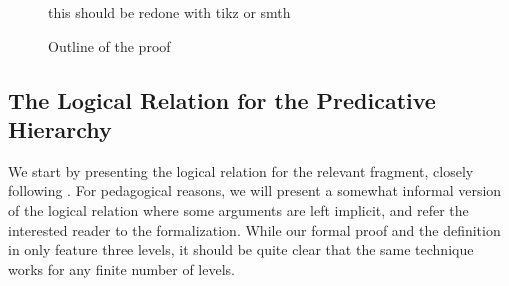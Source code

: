 \begin{figure}
	this should be redone with tikz or smth
  \caption{Outline of the proof}
  \label{fig:proof-outline}
\end{figure}



\subsection{The Logical Relation for the Predicative Hierarchy}

We start by presenting the logical relation for the relevant
fragment, closely following .
%
For pedagogical reasons, we will present a somewhat informal version
of the logical relation where some arguments are left implicit, and
refer the interested reader to the \Agda formalization.
%
While our formal proof and the definition in
 only feature three levels, it should be
quite clear that the same technique works for any finite number of
levels.

